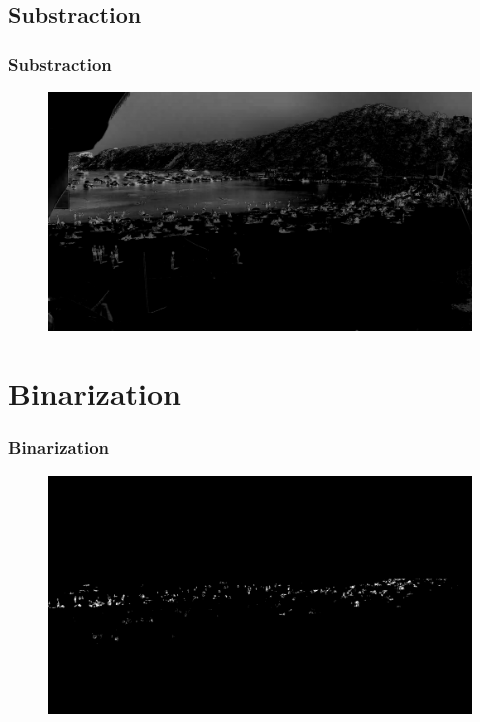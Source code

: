 \documentclass{beamer}
\begin{document}
\subsection*{Substraction}
\begin{frame}
    \frametitle{Substraction}
    \begin{figure}
        \centering
        \includegraphics[width=\textwidth]{../gen/sub/1660305600.jpg}
    \end{figure}
\end{frame}

\section*{Binarization}
\begin{frame}
    \frametitle{Binarization}
    \begin{figure}
        \centering
        \includegraphics[width=\textwidth]{../gen/bin/1660305600.jpg}
    \end{figure}
\end{frame}
\end{document}
